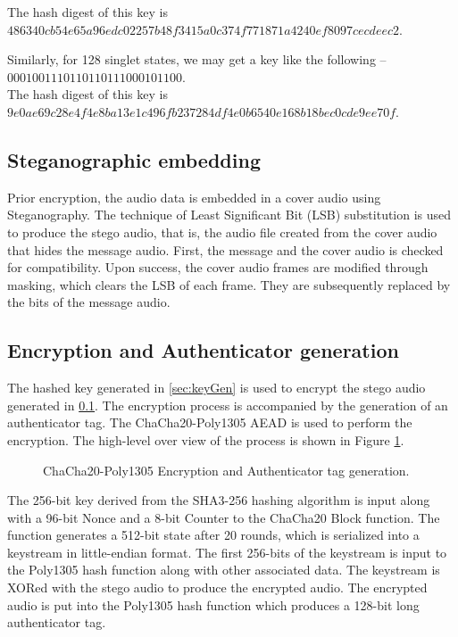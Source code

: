 \documentclass[a4paper]{cas-sc}
\begin{document}
\noindent The hash digest of this key is $486340cb54e65a96edc02257b48f3415a0c374f771871a4240ef8097cecdeec2$.

Similarly, for 128 singlet states, we may get a key like the following -- $0001001110110110111000101100$. \\
The hash digest of this key is $9e0ae69c28e4f4e8ba13e1c496fb237284df4e0b6540e168b18bec0cde9ee70f$.
\subsection{Steganographic embedding}
\label{sec:stegoEncode}
Prior encryption, the audio data is embedded in a cover audio using Steganography. The technique of Least Significant Bit (LSB) substitution is used to produce the stego audio, that is, the audio file created from the cover audio that hides the message audio. First, the message and the cover audio is checked for compatibility. Upon success, the cover audio frames are modified through masking, which clears the LSB of each frame. They are subsequently replaced by the bits of the message audio.
\subsection{Encryption and Authenticator generation}
\label{sec:chacha20poly1305encryption}
The hashed key generated in \ref{sec:keyGen} is used to encrypt the stego audio generated in \ref{sec:stegoEncode}. The encryption process is accompanied by the generation of an authenticator tag. The ChaCha20-Poly1305 AEAD is used to perform the encryption. The high-level over view of the process is shown in Figure \ref{fig:chacha20poly1305encryption}.
\begin{figure}[pos=h]
    \centering
    
    \caption{ChaCha20-Poly1305 Encryption and Authenticator tag generation.}
    \label{fig:chacha20poly1305encryption}
\end{figure}

The 256-bit key derived from the SHA3-256 hashing algorithm is input along with a 96-bit Nonce and a 8-bit Counter to the ChaCha20 Block function. The function generates a 512-bit state after 20 rounds, which is serialized into a keystream in little-endian format. The first 256-bits of the keystream is input to the Poly1305 hash function along with other associated data. The keystream is XORed with the stego audio to produce the encrypted audio. The encrypted audio is put into the Poly1305 hash function which produces a 128-bit long authenticator tag.
\end{document}
